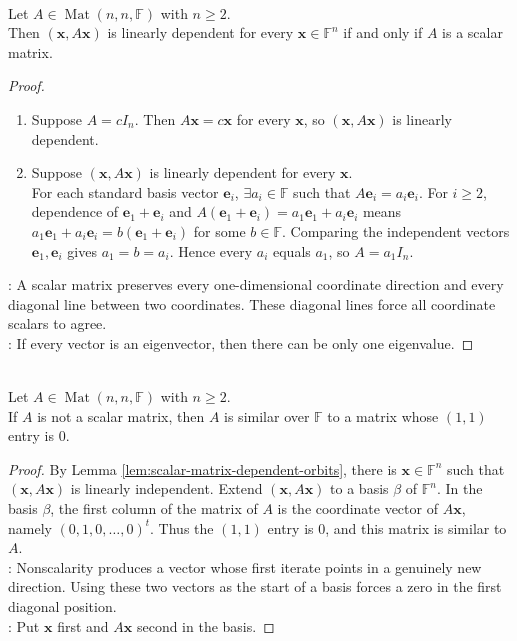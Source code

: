 \begin{lemma} \label{lem:scalar-matrix-dependent-orbits} \\
Let $A\in\operatorname{Mat}(n,n,\mathbb{F})$ with $n\geq2$.\\
Then $(\mathbf{x},A\mathbf{x})$ is linearly dependent for every $\mathbf{x}\in\mathbb{F}^n$ if and only if $A$ is a scalar matrix.
\begin{proof}
\begin{enumerate}[label=\roman*.]
\setlength{\itemsep}{0pt}
\item[$(\Rightarrow)$] Suppose $A=cI_n$. Then $A\mathbf{x}=c\mathbf{x}$ for every $\mathbf{x}$, so $(\mathbf{x},A\mathbf{x})$ is linearly dependent.
\item[$(\Leftarrow)$] Suppose $(\mathbf{x},A\mathbf{x})$ is linearly dependent for every $\mathbf{x}$.\\
For each standard basis vector $\mathbf{e}_i$, $\exists a_i\in\mathbb{F}$ such that $A\mathbf{e}_i=a_i\mathbf{e}_i$. For $i\geq2$, dependence of $\mathbf{e}_1+\mathbf{e}_i$ and $A(\mathbf{e}_1+\mathbf{e}_i)=a_1\mathbf{e}_1+a_i\mathbf{e}_i$ means $a_1\mathbf{e}_1+a_i\mathbf{e}_i=b(\mathbf{e}_1+\mathbf{e}_i)$ for some $b\in\mathbb{F}$. Comparing the independent vectors $\mathbf{e}_1,\mathbf{e}_i$ gives $a_1=b=a_i$. Hence every $a_i$ equals $a_1$, so $A=a_1I_n$.
\end{enumerate}
: A scalar matrix preserves every one-dimensional coordinate direction and every diagonal line between two coordinates. These diagonal lines force all coordinate scalars to agree.\\
: If every vector is an eigenvector, then there can be only one eigenvalue.
\end{proof}
\end{lemma}

\begin{lemma} \label{lem:nonscalar-similar-zero-entry} \\
Let $A\in\operatorname{Mat}(n,n,\mathbb{F})$ with $n\geq2$.\\
If $A$ is not a scalar matrix, then $A$ is similar over $\mathbb{F}$ to a matrix whose $(1,1)$ entry is $0$.
\begin{proof}
By Lemma \ref{lem:scalar-matrix-dependent-orbits}, there is $\mathbf{x}\in\mathbb{F}^n$ such that $(\mathbf{x},A\mathbf{x})$ is linearly independent. Extend $(\mathbf{x},A\mathbf{x})$ to a basis $\beta$ of $\mathbb{F}^n$. In the basis $\beta$, the first column of the matrix of $A$ is the coordinate vector of $A\mathbf{x}$, namely $(0,1,0,\ldots,0)^t$. Thus the $(1,1)$ entry is $0$, and this matrix is similar to $A$.\\
: Nonscalarity produces a vector whose first iterate points in a genuinely new direction. Using these two vectors as the start of a basis forces a zero in the first diagonal position.\\
: Put $\mathbf{x}$ first and $A\mathbf{x}$ second in the basis.
\end{proof}
\end{lemma}

